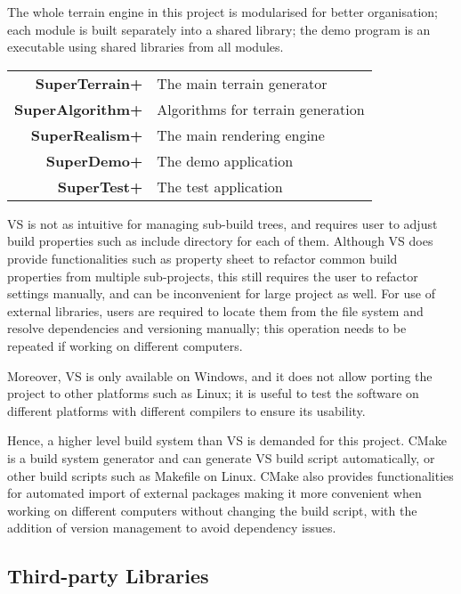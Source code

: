 \documentclass[oneside, a4paper]{report}
\begin{document}
    The whole terrain engine in this project is modularised for better organisation; each module is built separately into a shared library; the demo program is an executable using shared libraries from all modules.

    \begin{center}
        \begin{tabular}{rl}
            \textbf{SuperTerrain+} & The main terrain generator \\
            \textbf{SuperAlgorithm+} & Algorithms for terrain generation \\
            \textbf{SuperRealism+} & The main rendering engine \\
            \textbf{SuperDemo+} & The demo application \\
            \textbf{SuperTest+} & The test application
        \end{tabular}
    \end{center}
    
    VS is not as intuitive for managing sub-build trees, and requires user to adjust build properties such as include directory for each of them. Although VS does provide functionalities such as property sheet to refactor common build properties from multiple sub-projects, this still requires the user to refactor settings manually, and can be inconvenient for large project as well. For use of external libraries, users are required to locate them from the file system and resolve dependencies and versioning manually; this operation needs to be repeated if working on different computers.

    Moreover, VS is only available on Windows, and it does not allow porting the project to other platforms such as Linux; it is useful to test the software on different platforms with different compilers to ensure its usability.

    Hence, a higher level build system than VS is demanded for this project. CMake is a build system generator and can generate VS build script automatically, or other build scripts such as Makefile on Linux. CMake also provides functionalities for automated import of external packages making it more convenient when working on different computers without changing the build script, with the addition of version management to avoid dependency issues.

    \subsection{Third-party Libraries}
\end{document}
